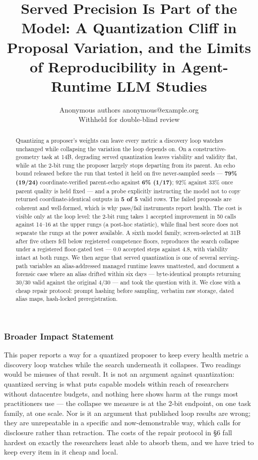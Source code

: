 \documentclass[10pt]{article}
\title{Served Precision Is Part of the Model: A Quantization Cliff in
Proposal Variation, and the Limits of Reproducibility in Agent-Runtime
LLM Studies}
\author{\name Anonymous authors \email anonymous@example.org \\
      \addr Withheld for double-blind review}
\begin{document}
\maketitle

\begin{abstract}
Quantizing a proposer's weights can leave every metric a discovery loop watches unchanged while collapsing the variation the loop depends on. On a constructive-geometry task at 14B, degrading served quantization leaves viability and validity flat, while at the 2-bit rung the proposer largely stops departing from its parent. An echo bound released before the run that tested it held on five never-sampled seeds --- \textbf{79\% (19/24)} coordinate-verified parent-echo against \textbf{6\% (1/17)}; 92\% against 33\% once parent quality is held fixed --- and a probe explicitly instructing the model not to copy returned coordinate-identical outputs in \textbf{5 of 5} valid rows. The failed proposals are coherent and well-formed, which is why pass/fail instruments report health. The cost is visible only at the loop level: the 2-bit rung takes 1 accepted improvement in 50 calls against 14--16 at the upper rungs (a post-hoc statistic), while final best score does not separate the rungs at the power available. A sixth model family, screen-selected at 31B after five others fell below registered competence floors, reproduces the search collapse under a registered floor-gated test --- 0.0 accepted steps against 4.8, with viability intact at both rungs. We then argue that served quantization is one of several serving-path variables an alias-addressed managed runtime leaves unattested, and document a forensic case where an alias drifted within six days --- byte-identical prompts returning 30/30 valid against the original 4/30 --- and took the question with it. We close with a cheap repair protocol: prompt hashing before sampling, verbatim raw storage, dated alias maps, hash-locked preregistration.
\end{abstract}





\subsubsection*{Broader Impact Statement}

This paper reports a way for a quantized proposer to keep every health metric a
discovery loop watches while the search underneath it collapses. Two readings
would be misuses of that result. It is not an argument against quantization:
quantized serving is what puts capable models within reach of researchers
without datacentre budgets, and nothing here shows harm at the rungs most
practitioners use --- the collapse we measure is at the 2-bit endpoint, on one
task family, at one scale. Nor is it an argument that published loop results are
wrong; they are unrepeatable in a specific and now-demonstrable way, which
calls for disclosure rather than retraction. The costs of the repair protocol in
\S6 fall hardest on exactly the researchers least able to absorb them, and we
have tried to keep every item in it cheap and local.
\end{document}
